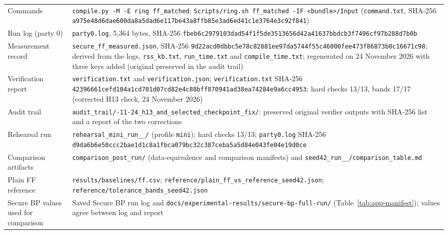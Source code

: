 {\begin{longtable}{@{}>{\raggedright\arraybackslash}p{3.8cm}>{\raggedright\arraybackslash}p{10.0cm}@{}}
Commands & \texttt{compile.py -M -E ring ff\_matched}; \texttt{Scripts/ring.sh ff\_matched -IF \textless{}bundle\textgreater{}/Input} (\texttt{command.txt}, SHA-256 \texttt{a975e48d6dae600d\allowbreak a8a5dad6e117be43\allowbreak a8ffb85e3ad6ed41\allowbreak c1e3764e3c92f841}) \\
Run log (party 0) & \texttt{party0.log}, 5{,}364 bytes, SHA-256 \texttt{fbeb6c2979103dad\allowbreak 54f1f5de3513656d\allowbreak 42a41637bbdcb3f7\allowbreak 496cf97b288d7b0b} \\
Measurement record & \texttt{secure\_ff\_measured.json}, SHA-256 \texttt{9d22acd0dbbc5e78\allowbreak c82881ee97da5744\allowbreak f55c46000fee473f\allowbreak 86873b0c16671c98}; derived from the logs, \texttt{rss\_kb.txt}, \texttt{run\_time.txt} and \texttt{compile\_time.txt}; regenerated on 24 November 2026 with three keys added (original preserved in the audit trail) \\
Verification report & \texttt{verification.txt} and \texttt{verification.json}; \texttt{verification.txt} SHA-256 \texttt{42396661cefd104a\allowbreak 1cd701d07cd82e4c\allowbreak 88bff870941ad38e\allowbreak a74284e9a6cc4953}; hard checks 13/13, bands 17/17 (corrected H13 check, 24 November 2026) \\
Audit trail & \texttt{audit\_trail/\allowbreak 2026-11-24\_\allowbreak h13\_\allowbreak and\_\allowbreak selected\_\allowbreak checkpoint\_\allowbreak fix/}: preserved original verifier outputs with SHA-256 list and a report of the two corrections \\
Rehearsal run & \texttt{rehearsal\_\allowbreak mini\_\allowbreak run\_\allowbreak 20261122\_\allowbreak 212103/} (profile \texttt{mini}); hard checks 13/13; \texttt{party0.log} SHA-256 \texttt{d9da6b6e50ccc2ba\allowbreak e1d1c8a1fbca079b\allowbreak c32c387ceba5a5d8\allowbreak 4e043fe04e19d0ce} \\
Comparison artifacts & \texttt{comparison\_\allowbreak post\_\allowbreak run/} (data-equivalence and comparison manifests) and \texttt{seed42\_\allowbreak run\_\allowbreak 20261122\_\allowbreak 212319/\allowbreak comparison\_\allowbreak table.md} \\
Plain FF reference & \texttt{results/\allowbreak baselines/\allowbreak ff.csv}; \texttt{reference/\allowbreak plain\_\allowbreak ff\_\allowbreak vs\_\allowbreak reference\_\allowbreak seed42.json}; \texttt{reference/\allowbreak tolerance\_\allowbreak bands\_\allowbreak seed42.json} \\
Secure BP values used for comparison & Saved Secure BP run log and \texttt{docs/\allowbreak experimental-results/\allowbreak secure-bp-full-run/} (Table~\ref{tab:app-manifest}); values agree between log and report \\
\bottomrule
\end{longtable}
}

